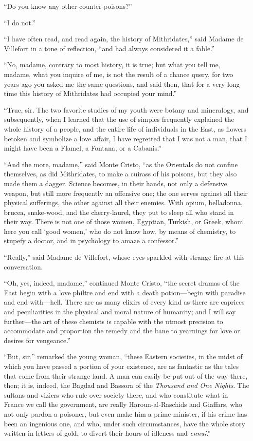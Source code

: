 “Do you know any other counter-poisons?”

“I do not.”

“I have often read, and read again, the history of Mithridates,” said
Madame de Villefort in a tone of reflection, “and had always considered
it a fable.”

“No, madame, contrary to most history, it is true; but what you tell
me, madame, what you inquire of me, is not the result of a chance
query, for two years ago you asked me the same questions, and said
then, that for a very long time this history of Mithridates had
occupied your mind.”

“True, sir. The two favorite studies of my youth were botany and
mineralogy, and subsequently, when I learned that the use of simples
frequently explained the whole history of a people, and the entire life
of individuals in the East, as flowers betoken and symbolize a love
affair, I have regretted that I was not a man, that I might have been a
Flamel, a Fontana, or a Cabanis.”

“And the more, madame,” said Monte Cristo, “as the Orientals do not
confine themselves, as did Mithridates, to make a cuirass of his
poisons, but they also made them a dagger. Science becomes, in their
hands, not only a defensive weapon, but still more frequently an
offensive one; the one serves against all their physical sufferings,
the other against all their enemies. With opium, belladonna, brucea,
snake-wood, and the cherry-laurel, they put to sleep all who stand in
their way. There is not one of those women, Egyptian, Turkish, or
Greek, whom here you call ‘good women,’ who do not know how, by means
of chemistry, to stupefy a doctor, and in psychology to amaze a
confessor.”

“Really,” said Madame de Villefort, whose eyes sparkled with strange
fire at this conversation.

“Oh, yes, indeed, madame,” continued Monte Cristo, “the secret dramas
of the East begin with a love philtre and end with a death potion—begin
with paradise and end with—hell. There are as many elixirs of every
kind as there are caprices and peculiarities in the physical and moral
nature of humanity; and I will say further—the art of these chemists is
capable with the utmost precision to accommodate and proportion the
remedy and the bane to yearnings for love or desires for vengeance.”

“But, sir,” remarked the young woman, “these Eastern societies, in the
midst of which you have passed a portion of your existence, are as
fantastic as the tales that come from their strange land. A man can
easily be put out of the way there, then; it is, indeed, the Bagdad and
Bassora of the \textit{Thousand and One Nights}. The sultans and viziers who
rule over society there, and who constitute what in France we call the
government, are really Haroun-al-Raschids and Giaffars, who not only
pardon a poisoner, but even make him a prime minister, if his crime has
been an ingenious one, and who, under such circumstances, have the
whole story written in letters of gold, to divert their hours of
idleness and \textit{ennui}.”


